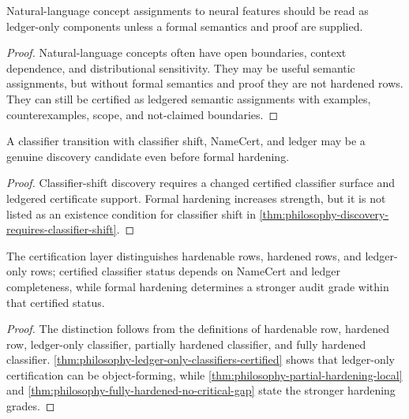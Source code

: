\begin{theorem}
\label{thm:philosophy-concept-labels-ledger-only-before-hardening}
Natural-language concept assignments to neural features should be read as
ledger-only components unless a formal semantics and proof are supplied.
\end{theorem}
\begin{proof}
Natural-language concepts often have open boundaries, context dependence,
and distributional sensitivity. They may be useful semantic assignments,
but without formal semantics and proof they are not hardened rows. They
can still be certified as ledgered semantic assignments with examples,
counterexamples, scope, and not-claimed boundaries.
\end{proof}

\begin{theorem}
\label{thm:philosophy-ledger-only-discovery-candidates-genuine}
A classifier transition with classifier shift, NameCert, and ledger may
be a genuine discovery candidate even before formal hardening.
\end{theorem}
\begin{proof}
Classifier-shift discovery requires a changed certified classifier
surface and ledgered certificate support. Formal hardening increases
strength, but it is not listed as an existence condition for classifier
shift in \autoref{thm:philosophy-discovery-requires-classifier-shift}.
\end{proof}

\begin{theorem}
\label{thm:philosophy-hardening-taxonomy-theorem}
The certification layer distinguishes hardenable rows, hardened rows, and
ledger-only rows; certified classifier status depends on NameCert and
ledger completeness, while formal hardening determines a stronger audit
grade within that certified status.
\end{theorem}
\begin{proof}
The distinction follows from the definitions of hardenable row, hardened
row, ledger-only classifier, partially hardened classifier, and fully
hardened classifier. \autoref{thm:philosophy-ledger-only-classifiers-certified}
shows that ledger-only certification can be object-forming, while
\autoref{thm:philosophy-partial-hardening-local} and
\autoref{thm:philosophy-fully-hardened-no-critical-gap} state the
stronger hardening grades.
\end{proof}

